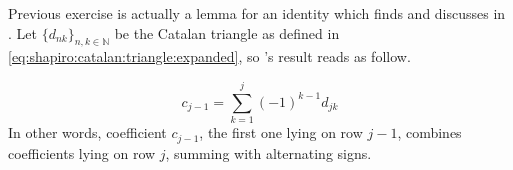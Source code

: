 Previous exercise is actually a lemma for an identity which
\citeauthor{eplett:1979} finds and discusses in \cite{eplett:1979}.  Let
$\lbrace d_{nk}\rbrace_{n,k\in\mathbb{N}}$ be the Catalan triangle as defined
in \autoref{eq:shapiro:catalan:triangle:expanded}, so \citeauthor{eplett:1979}'s
result reads as follow.

\begin{theorem}
    \begin{displaymath}                
        c_{j-1}=\sum_{k=1}^{j}{(-1)^{k-1}d_{jk}}
    \end{displaymath}                
    In other words, coefficient $c_{j-1}$, the first one lying on row $j-1$,
    combines coefficients lying on row $j$, summing with alternating signs.
\end{theorem}
